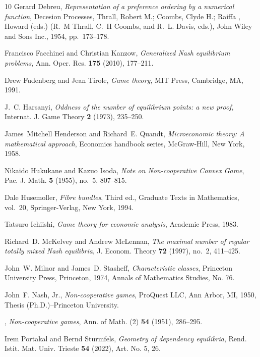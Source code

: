 \documentclass[a4paper,11pt,reqno,english]{amsart}
\theoremstyle{plain}
\theoremstyle{definition}
\begin{document}
\begin{thebibliography}{10}
Gerard Debreu, \emph{Representation of a preference ordering by a numerical
  function}, Decesion Processes, Thrall, Robert M.; Coombs, Clyde H.; Raiffa ,
  Howard (eds.) (R.~M Thrall, C.~H Coombs, and R.~L. Davis, eds.), John Wiley
  and Sons Inc., 1954, pp.~173--178.

Francisco Facchinei and Christian Kanzow, \emph{{Generalized {N}ash equilibrium
  problems}}, Ann. Oper. Res. \textbf{175} (2010), 177--211.

Drew Fudenberg and Jean Tirole, \emph{Game theory}, MIT Press, Cambridge, MA,
  1991.

J.~C. Harsanyi, \emph{Oddness of the number of equilibrium points: a new
  proof}, Internat. J. Game Theory \textbf{2} (1973), 235--250.

James~Mitchell Henderson and Richard~E. Quandt, \emph{{Microeconomic theory: A
  mathematical approach}}, Economics handbook series, McGraw-Hill, New York,
  1958.

Nikaido Hukukane and Kazuo Isoda, \emph{{Note on Non-cooperative Convex Game}},
  Pac. J. Math. \textbf{5} (1955), no.~5, 807--815.

Dale Husemoller, \emph{Fibre bundles}, {Third} ed., Graduate Texts in
  Mathematics, vol.~20, Springer-Verlag, New York, 1994.

Tatsuro Ichiishi, \emph{Game theory for economic analysis}, Academic Press,
  1983.

Richard~D. McKelvey and Andrew McLennan, \emph{The maximal number of regular
  totally mixed {N}ash equilibria}, J. Econom. Theory \textbf{72} (1997),
  no.~2, 411--425.

John~W. Milnor and James~D. Stasheff, \emph{Characteristic classes}, Princeton
  University Press, Princeton, 1974, Annals of Mathematics Studies, No. 76.

John~F. Nash, Jr., \emph{Non-cooperative games}, ProQuest LLC, Ann Arbor, MI,
  1950, Thesis (Ph.D.)--Princeton University.

\bysame, \emph{Non-cooperative games}, Ann. of Math. (2) \textbf{54} (1951),
  286--295.

Irem Portakal and Bernd Sturmfels, \emph{Geometry of dependency equilibria},
  Rend. Istit. Mat. Univ. Trieste \textbf{54} (2022), Art. No. 5, 26.


\end{thebibliography}
\end{document}
